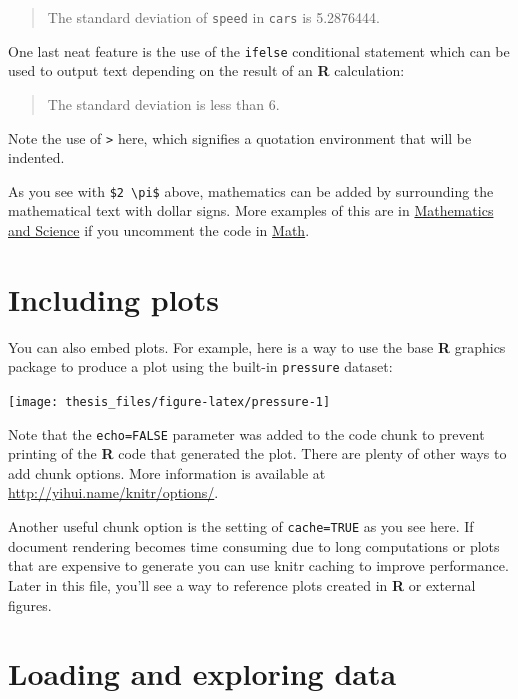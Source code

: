 \documentclass[12pt,twoside]{reedthesis}
\begin{document}
  \begin{quote}
  The standard deviation of \texttt{speed} in \texttt{cars} is 5.2876444.
  \end{quote}
  
  One last neat feature is the use of the \texttt{ifelse} conditional
  statement which can be used to output text depending on the result of an
  \textbf{R} calculation:
  
  \begin{quote}
  The standard deviation is less than 6.
  \end{quote}
  
  Note the use of \texttt{\textgreater{}} here, which signifies a
  quotation environment that will be indented.
  
  As you see with \texttt{\$2\ \textbackslash{}pi\$} above, mathematics
  can be added by surrounding the mathematical text with dollar signs.
  More examples of this are in \protect\hyperlink{math-sci}{Mathematics
  and Science} if you uncomment the code in
  \protect\hyperlink{math}{Math}.
  
  \section{Including plots}\label{including-plots}
  
  You can also embed plots. For example, here is a way to use the base
  \textbf{R} graphics package to produce a plot using the built-in
  \texttt{pressure} dataset:
  
  \begin{center}\texttt{[image: thesis\_files/figure-latex/pressure-1]} \end{center}
  
  Note that the \texttt{echo=FALSE} parameter was added to the code chunk
  to prevent printing of the \textbf{R} code that generated the plot.
  There are plenty of other ways to add chunk options. More information is
  available at \url{http://yihui.name/knitr/options/}.
  
  Another useful chunk option is the setting of \texttt{cache=TRUE} as you
  see here. If document rendering becomes time consuming due to long
  computations or plots that are expensive to generate you can use knitr
  caching to improve performance. Later in this file, you'll see a way to
  reference plots created in \textbf{R} or external figures.
  
  \hypertarget{loading-and-exploring-data}{\section{Loading and exploring
  data}\label{loading-and-exploring-data}}
  
\end{document}
